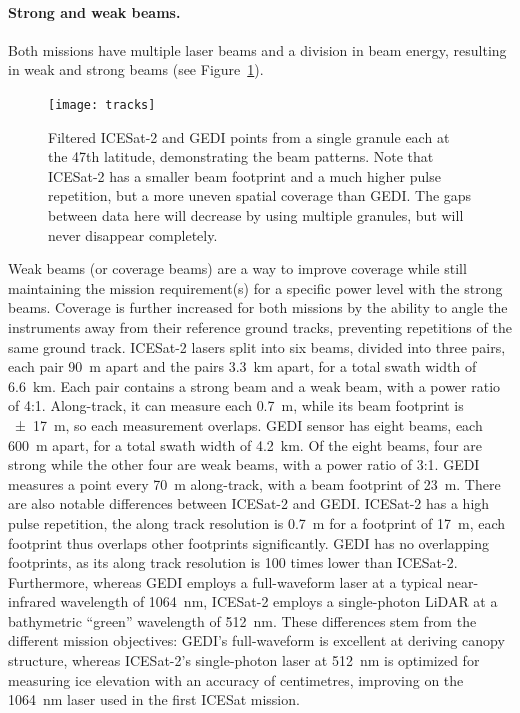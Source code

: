 %

\paragraph{Strong and weak beams.}
Both missions have multiple laser beams and a division in beam energy, resulting in weak and strong beams (see Figure~\ref{fig:beams}).
\begin{figure}
  \centering
  \texttt{[image: tracks]}
  \caption{Filtered ICESat-2 and GEDI points from a single granule each at the 47th latitude, demonstrating the beam patterns.
  Note that ICESat-2 has a smaller beam footprint and a much higher pulse repetition, but a more uneven spatial coverage than GEDI\@.
  The gaps between data here will decrease by using multiple granules, but will never disappear completely.}%
\label{fig:beams}
\end{figure}
Weak beams (or coverage beams) are a way to improve coverage while still maintaining the mission requirement(s) for a specific power level with the strong beams.
Coverage is further increased for both missions by the ability to angle the instruments away from their reference ground tracks, preventing repetitions of the same ground track.
ICESat-2 lasers split into six beams, divided into three pairs, each pair \qty{90}{m} apart and the pairs \qty{3.3}{km} apart, for a total swath width of \qty{6.6}{km}.
Each pair contains a strong beam and a weak beam, with a power ratio of 4:1.
Along-track, it can measure each \qty{0.7}{m}, while its beam footprint is \qty{\pm17}{m}, so each measurement overlaps.
GEDI sensor has eight beams, each \qty{600}{m} apart, for a total swath width of \qty{4.2}{km}.
Of the eight beams, four are strong while the other four are weak beams, with a power ratio of 3:1.
GEDI measures a point every \qty{70}{m} along-track, with a beam footprint of \qty{23}{m}.
There are also notable differences between ICESat-2 and GEDI\@.
ICESat-2 has a high pulse repetition, the along track resolution is \qty{0.7}{m} for a footprint of \qty{17}{m}, each footprint thus overlaps other footprints significantly.
GEDI has no overlapping footprints, as its along track resolution is 100 times lower than ICESat-2.
Furthermore, whereas GEDI employs a full-waveform laser at a typical near-infrared wavelength of \qty{1064}{nm}, ICESat-2 employs a single-photon LiDAR at a bathymetric ``green'' wavelength of \qty{512}{nm}.
These differences stem from the different mission objectives: GEDI's full-waveform is excellent at deriving canopy structure, whereas ICESat-2's single-photon laser at \qty{512}{nm} is optimized for measuring ice elevation with an accuracy of centimetres, improving on the \qty{1064}{nm} laser used in the first ICESat mission.

